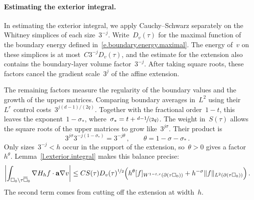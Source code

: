 \documentclass[11pt,letterpaper]{article}
\numberwithin{equation}{section}
\theoremstyle{definition}
\renewcommand{\a}{\mathbf{a}}
\newcommand{\nf}{\nicefrac}
\newcommand{\cu}{\square}
\DeclarePairedDelimiter{\norm}{\lVert}{\rVert}
\begin{document}
\paragraph{Estimating the exterior integral.} In estimating the exterior integral, we apply Cauchy--Schwarz separately on the Whitney simplices of each size~$3^{-j}$. Write~$D_v(\tau)$ for the maximal function of the boundary energy defined in~\eqref{e.boundary.energy.maximal}. The energy of~$v$ on these simplices is at most~$C3^{-j}D_v(\tau)$, and the estimate for the extension also contains the boundary-layer volume factor~$3^{-j}$. After taking square roots, these factors cancel the gradient scale~$3^j$ of the affine extension.

The remaining factors measure the regularity of the boundary values and the growth of the upper matrices. Comparing boundary averages in~$L^2$ using their~$L^r$ control costs~$3^{j(d-1)/(2q)}$. Together with the fractional order~$1-t$, this leaves the exponent~$1-\sigma_*$, where~$\sigma_*=t+\nf{d-1}{(2q)}$. The weight in~$S(\tau)$ allows the square roots of the upper matrices to grow like~$3^{j\sigma}$. Their product is
\begin{equation*}
    3^{j\sigma}3^{-j(1-\sigma_*)}=3^{-j\theta}
    \,,\qquad \theta=1-\sigma-\sigma_*
    \,.
\end{equation*}
Only sizes~$3^{-j}<h$ occur in the support of the extension, so~$\theta>0$ gives a factor~$h^\theta$. Lemma~\ref{l.exterior.integral} makes this balance precise:
\begin{equation*}
    \biggl|\int_{\cu_0\setminus\tau\overline{\cu}_0}
        \nabla H_hf\cdot\a\nabla v\biggr|
    \leq CS(\tau)D_v(\tau)^{\nf12}
    \Bigl(
        h^\theta[f]_{W^{1-t,r}(\partial(\tau\cu_0))}
        +h^{-\sigma}\norm{f}_{L^2(\partial(\tau\cu_0))}
    \Bigr)
    \,.
\end{equation*}
The second term comes from cutting off the extension at width~$h$.
\end{document}

